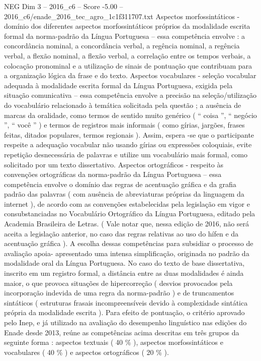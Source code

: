 \begin{textsample}{NEG Dim 3 – 2016\_c6 – Score -5.00 – 2016\_c6/enade\_2016\_tec\_agro\_1c1f311707.txt}
Aspectos morfossintáticos - domínio dos diferentes aspectos morfossintáticos próprios da modalidade escrita formal da norma-padrão da Língua Portuguesa – essa competência envolve : a concordância nominal, a concordância verbal, a regência nominal, a regência verbal, a flexão nominal, a flexão verbal, a correlação entre os tempos verbais, a colocação pronominal e a utilização de sinais de pontuação que contribuam para a organização lógica da frase e do texto.
Aspectos vocabulares - seleção vocabular adequada à modalidade escrita formal da Língua Portuguesa, exigida pela situação comunicativa – essa competência envolve a precisão na seleção/utilização do vocabulário relacionado à temática solicitada pela questão ; a ausência de marcas da oralidade, como termos de sentido muito genérico ( “ coisa ”, “ negócio ”, “ você ” ) e termos de registros mais informais ( como gírias, jargões, frases feitas, ditados populares, termos regionais ).
Assim, espera -se que o participante respeite a adequação vocabular não usando gírias ou expressões coloquiais, evite repetição desnecessária de palavras e utilize um vocabulário mais formal, como solicitado por um texto dissertativo.
Aspectos ortográficos - respeito às convenções ortográficas da norma-padrão da Língua Portuguesa – essa competência envolve o domínio das regras de acentuação gráfica e da grafia padrão das palavras ( com ausência de abreviaturas próprias da linguagem da internet ), de acordo com as convenções estabelecidas pela legislação em vigor e consubstanciadas no Vocabulário Ortográfico da Língua Portuguesa, editado pela Academia Brasileira de Letras. ( Vale notar que, nessa edição de 2016, não será aceita a legislação anterior, no caso das regras relativas ao uso do hífen e da acentuação gráfica ).
A escolha dessas competências para subsidiar o processo de avaliação apoia- apresentado uma intensa simplificação, originada no padrão da modalidade oral da Língua Portuguesa.
No caso do texto de base dissertativa, inscrito em um registro formal, a distância entre as duas modalidades é ainda maior, o que provoca situações de hipercorreção ( desvios provocados pela incorporação indevida de uma regra da norma-padrão ) e de truncamentos sintáticos ( estruturas frasais incompreensíveis devido à complexidade sintática própria da modalidade escrita ).
Para efeito de pontuação, o critério aprovado pelo Inep, e já utilizado na avaliação do desempenho linguístico nas edições do Enade desde 2013, reúne as competências acima descritas em três grupos da seguinte forma : aspectos textuais ( 40 \% ), aspectos morfossintáticos e vocabulares ( 40 \% ) e aspectos ortográficos ( 20 \% ).

\end{textsample}
